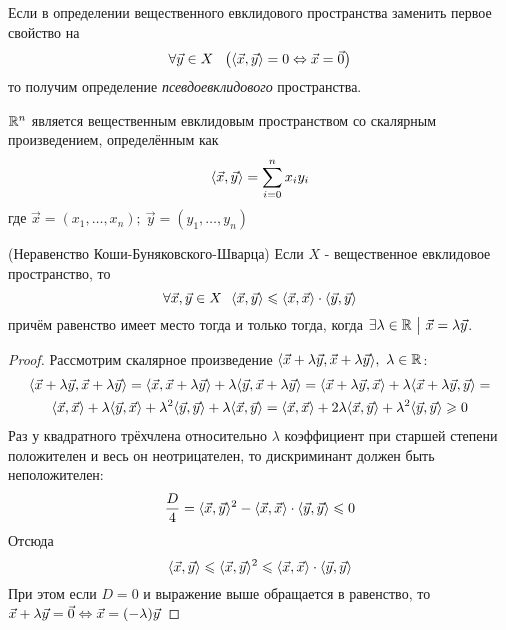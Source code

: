 \begin{addition}
	Если в определении вещественного евклидового пространства заменить первое свойство на
	\[
	\forall \vec{y} \in X\ \ \left(\trbr{\vec{x}, \vec{y}} = 0 \lra \vec{x} = \vec{0}\right)
	\]
	то получим определение \textit{псевдоевклидового} пространства.
\end{addition}

\begin{lemma}
	$\mathbb{R}^n$ является вещественным евклидовым пространством со скалярным произведением, определённым как
	\[
		\langle\vec{x}, \vec{y}\rangle = \sum\limits_{i = 0}^n x_iy_i
	\]
	где $\vec{x} = (x_1, \ldots, x_n);\ \vec{y} = (y_1, \ldots, y_n)$
\end{lemma}

\begin{theorem} (Неравенство Коши-Буняковского-Шварца)
	Если $X$ - вещественное евклидовое пространство, то
	\[
		\forall \vec{x}, \vec{y} \in X\ \ \langle\vec{x}, \vec{y}\rangle \leqslant \langle\vec{x}, \vec{x}\rangle \cdot \langle\vec{y}, \vec{y}\rangle
	\]
	причём равенство имеет место тогда и только тогда, когда $\exists \lambda \in \mathbb{R} \ \big|\  \vec{x} = \lambda \vec{y}$.
\end{theorem}

\begin{proof}
	Рассмотрим скалярное произведение $\langle\vec{x} + \lambda \vec{y}, \vec{x} + \lambda \vec{y}\rangle,\ \lambda \in \mathbb{R}$:
	\begin{multline*}
		\langle\vec{x} + \lambda \vec{y}, \vec{x} + \lambda \vec{y}\rangle = \langle\vec{x}, \vec{x} + \lambda\vec{y}\rangle + \lambda\langle\vec{y}, \vec{x} + \lambda\vec{y}\rangle = \langle\vec{x} + \lambda\vec{y}, \vec{x}\rangle + \lambda\langle\vec{x} + \lambda\vec{y}, \vec{y}\rangle =
		\\
		\langle\vec{x}, \vec{x}\rangle + \lambda\langle\vec{y}, \vec{x}\rangle + \lambda^2\langle\vec{y}, \vec{y}\rangle + \lambda\langle\vec{x}, \vec{y}\rangle = \langle\vec{x}, \vec{x}\rangle + 2\lambda\langle\vec{x}, \vec{y}\rangle + \lambda^2\langle\vec{y}, \vec{y}\rangle \geqslant 0
	\end{multline*}
	Раз у квадратного трёхчлена относительно $\lambda$ коэффициент при старшей степени положителен и весь он неотрицателен, то дискриминант должен быть неположителен:
	\[
		\frac{D}{4} = \langle\vec{x}, \vec{y}\rangle^2 - \langle\vec{x}, \vec{x}\rangle \cdot \langle\vec{y}, \vec{y}\rangle \leqslant 0
	\]
	Отсюда
	\[
		\langle\vec{x}, \vec{y}\rangle \leqslant \langle\vec{x}, \vec{y}\rangle^2 \leqslant \langle\vec{x}, \vec{x}\rangle \cdot \langle\vec{y}, \vec{y}\rangle
	\]
	При этом если $D = 0$ и выражение выше обращается в равенство, то $\vec{x} + \lambda\vec{y} = \vec{0} \Leftrightarrow \vec{x} = (-\lambda)\vec{y}$
\end{proof}

